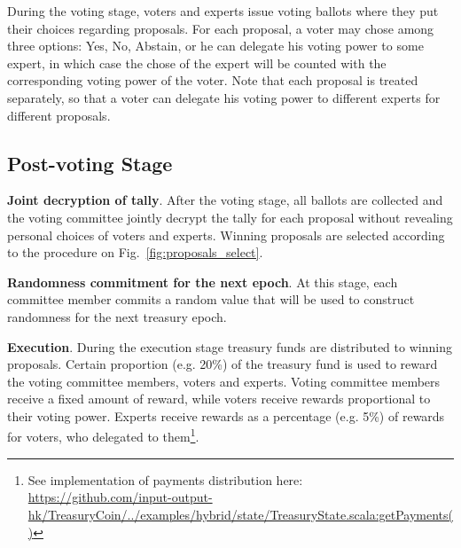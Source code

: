 During the voting stage, voters and experts issue voting ballots where they put their choices regarding proposals. For each proposal, a voter may chose among three options: Yes, No, Abstain, or he can delegate his voting power to some expert, in which case the chose of the expert will be counted with the corresponding voting power of the voter.
Note that each proposal is treated separately, so that a voter can delegate his voting power to different experts for different proposals.

\subsection{Post-voting Stage}

\textbf{Joint decryption of tally}. After the voting stage, all ballots are collected and the voting committee jointly decrypt the tally for each proposal without revealing personal choices of voters and experts. Winning proposals are selected according to the procedure on Fig.~\ref{fig:proposals_select}.


\newpage
\textbf{Randomness commitment for the next epoch}. At this stage, each committee member commits a random value that will be used to construct randomness for the next treasury epoch.

\textbf{Execution}. During the execution stage treasury funds are distributed to winning proposals. Certain proportion (e.g. 20\%) of the treasury fund is used to reward the voting committee members, voters and experts. Voting committee members receive a fixed amount of reward, while voters receive rewards proportional to their voting power. Experts receive rewards as a percentage (e.g. 5\%) of rewards for voters, who delegated to them\footnote{See implementation of payments distribution here:\\ \href{https://github.com/input-output-hk/TreasuryCoin/blob/master/examples/src/main/scala/examples/hybrid/state/TreasuryState.scala\#L537}{https://github.com/input-output-hk/TreasuryCoin/../examples/hybrid/state/TreasuryState.scala:getPayments()}}.